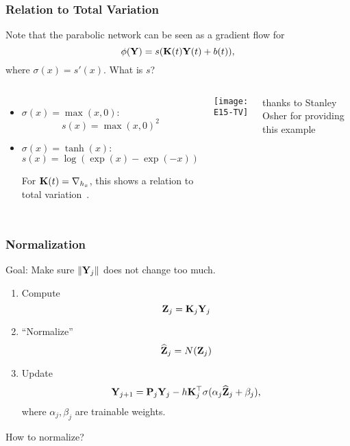 \documentclass[12pt,fleqn,handout]{beamer}
\begin{document}
\begin{frame}
	\frametitle{Relation to Total Variation}
	


	Note that the parabolic network can be seen as a gradient flow for
	$$
		\phi({\bf Y}) = s({\bf K}(t) {\bf Y}(t) + b(t)),
	$$
	where $\sigma(x) = s'(x)$. What is $s$?
	
	\begin{columns}
	\begin{itemize}
		\item $\sigma(x) = \max(x,0)$: 
		$$
			s(x) = \max(x,0)^2
		$$
		\item $\sigma(x) = \tanh(x)$:
		$$
			s(x) = \log(\exp(x) - \exp(-x))
		$$
		
		For ${\bf K}(t) = \nabla_{h_x}$, this shows a relation to total variation~\cite{RudinOsherFatemi1992}.
	\end{itemize}
		
		\texttt{[image: E15-TV]}
		
		\footnotesize thanks to Stanley Osher for providing this example
	\end{columns}
\end{frame}


\begin{frame}[fragile]\frametitle{Normalization}

Goal: Make sure $\|{\bf Y}_j\|$ does not change too much.


\bigskip

\begin{enumerate}
	\item Compute
$$ {\bf Z}_j = {\bf K}_j {\bf Y}_j $$

	\item ``Normalize''
$$ \widehat {{\bf Z}}_j = N( {\bf Z}_j) $$

	\item Update
	$$ 
	{\bf Y}_{j+1} = {\bf P}_j{\bf Y}_j - h {\bf K}_j^\top  \sigma( \alpha_j  \widehat {{\bf Z}}_j + \beta_j), $$
	where $\alpha_j,\beta_j$ are trainable weights.

\end{enumerate}





\bigskip
\bigskip

\begin{center}
How to normalize?	
\end{center}


\end{frame}
\end{document}
